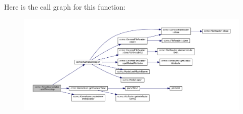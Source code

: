 Here is the call graph for this function\-:
\nopagebreak
\begin{figure}[H]
\begin{center}
\leavevmode
\includegraphics[width=350pt]{classccmc_1_1_time_interpolator_aaa61a9153116b891697833dfa46d16c9_cgraph}
\end{center}
\end{figure}


